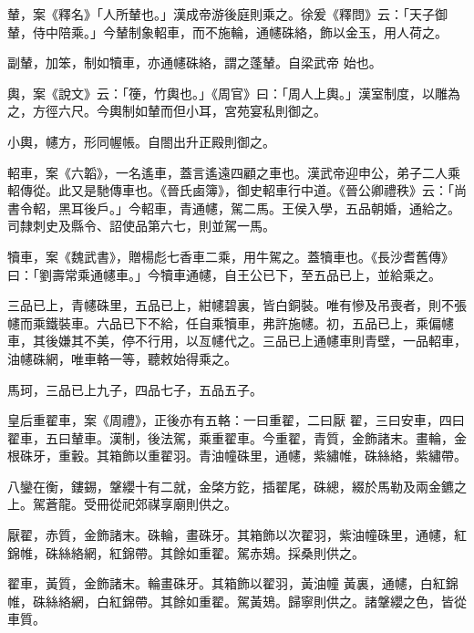 \begin{pinyinscope}
 輦，案《釋名》「人所輦也。」漢成帝游後庭則乘之。徐爰《釋問》云：「天子御輦，侍中陪乘。」今輦制象軺車，而不施輪，通幰硃絡，飾以金玉，用人荷之。



 副輦，加笨，制如犢車，亦通幰硃絡，謂之蓬輦。自梁武帝
 始也。



 輿，案《說文》云：「箯，竹輿也。」《周官》曰：「周人上輿。」漢室制度，以雕為之，方徑六尺。今輿制如輦而但小耳，宮苑宴私則御之。



 小輿，幰方，形同幄帳。自閤出升正殿則御之。



 軺車，案《六韜》，一名遙車，蓋言遙遠四顧之車也。漢武帝迎申公，弟子二人乘軺傳從。此又是馳傳車也。《晉氏鹵簿》，御史軺車行中道。《晉公卿禮秩》云：「尚書令軺，黑耳後戶。」今軺車，青通幰，駕二馬。王侯入學，五品朝婚，通給之。司隸刺史及縣令、詔使品第六七，則並駕一馬。



 犢車，案《魏武書》，贈楊彪七香車二乘，用牛駕之。蓋犢車也。《長沙耆舊傳》曰：「劉壽常乘通幰車。」今犢車通幰，自王公已下，至五品已上，並給乘之。



 三品已上，青幰硃里，五品已上，紺幰碧裏，皆白銅裝。唯有慘及吊喪者，則不張幰而乘鐵裝車。六品已下不給，任自乘犢車，弗許施幰。初，五品已上，乘偏幰車，其後嫌其不美，停不行用，以亙幰代之。三品已上通幰車則青壁，一品軺車，油幰硃網，唯車輅一等，聽敕始得乘之。



 馬珂，三品已上九子，四品七子，五品五子。



 皇后重翟車，案《周禮》，正後亦有五輅：一曰重翟，二曰厭
 翟，三曰安車，四曰翟車，五曰輦車。漢制，後法駕，乘重翟車。今重翟，青質，金飾諸末。畫輪，金根硃牙，重轂。其箱飾以重翟羽。青油幢硃里，通幰，紫繡帷，硃絲絡，紫繡帶。



 八鑾在衡，鏤錫，鞶纓十有二就，金棨方釳，插翟尾，硃總，綴於馬勒及兩金鑣之上。駕蒼龍。受冊從祀郊禖享廟則供之。



 厭翟，赤質，金飾諸末。硃輪，畫硃牙。其箱飾以次翟羽，紫油幢硃里，通幰，紅錦帷，硃絲絡網，紅錦帶。其餘如重翟。駕赤鳷。採桑則供之。



 翟車，黃質，金飾諸末。輪畫硃牙。其箱飾以翟羽，黃油幢
 黃裏，通幰，白紅錦帷，硃絲絡網，白紅錦帶。其餘如重翟。駕黃鳷。歸寧則供之。諸鞶纓之色，皆從車質。




\end{pinyinscope}
